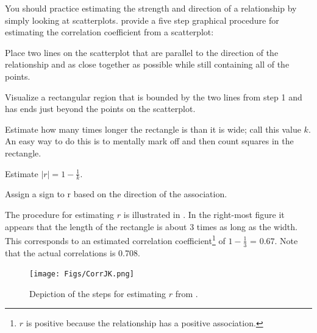 \documentclass[10pt,openany]{book}\usepackage[]{graphicx}\usepackage[]{color}
\begin{document}

\begin{minipage}{\textwidth}
You should practice estimating the strength and direction of a relationship by simply looking at scatterplots.  \cite{JohnsonKuby2000} provide a five step graphical procedure for estimating the correlation coefficient from a scatterplot:
\begin{Enumerate}
  \item Place two lines on the scatterplot that are parallel to the direction of the relationship and as close together as possible while still containing all of the points.
  \item Visualize a rectangular region that is bounded by the two lines from step 1 and has ends just beyond the points on the scatterplot.
  \item Estimate how many times longer the rectangle is than it is wide; call this value $k$.  An easy way to do this is to mentally mark off and then count squares in the rectangle.
  \item Estimate $|r|=1-\frac{1}{k}$.
  \item Assign a sign to r based on the direction of the association.
\end{Enumerate}
\end{minipage}

The \cite{JohnsonKuby2000} procedure for estimating $r$ is illustrated in .  In the right-most figure it appears that the length of the rectangle is about 3 times as long as the width.  This corresponds to an estimated correlation coefficient\footnote{$r$ is positive because the relationship has a positive association.} of $1-\frac{1}{3}$ = $0.67$.  Note that the actual correlations is 0.708.

\begin{figure}[htbp]
  \centering
    \texttt{[image: Figs/CorrJK.png]}
  \caption{Depiction of the steps for estimating $r$ from \cite{JohnsonKuby2000}.}
  \label{fig:corrjk}
\end{figure}
\end{document}

